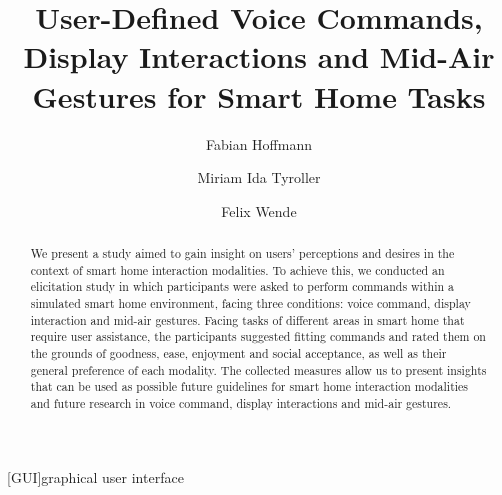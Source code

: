 \documentclass[sigchi]{acmart}
\begin{document}
	\begin{acronym}
	[GUI]{graphical user interface}
	\end{acronym}
	
	\title{User-Defined Voice Commands, Display Interactions and Mid-Air Gestures for Smart Home Tasks}
	
	\author{Fabian Hoffmann}
	
	\author{Miriam Ida Tyroller}
	
	\author{Felix Wende}
	
	
	\begin{abstract}
		We present a study aimed to gain insight on users' perceptions and desires in the context of smart home interaction modalities. To achieve this, we conducted an elicitation study in which participants were asked to perform commands within a simulated smart home environment, facing three conditions: voice command, display interaction and mid-air gestures. Facing tasks of different areas in smart home that require user assistance, the participants suggested fitting commands and rated them on the grounds of goodness, ease, enjoyment and social acceptance, as well as their general preference of each modality. The collected measures allow us to present insights that can be used as possible future guidelines for smart home interaction modalities and future research in voice command, display interactions and mid-air gestures.
	\end{abstract}
	
\end{document}
